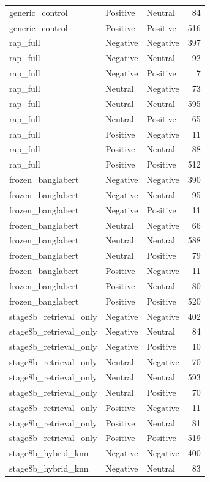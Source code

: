 \begin{tabular}{lllr}
generic_control & Positive & Neutral & 84 \\
generic_control & Positive & Positive & 516 \\
rap_full & Negative & Negative & 397 \\
rap_full & Negative & Neutral & 92 \\
rap_full & Negative & Positive & 7 \\
rap_full & Neutral & Negative & 73 \\
rap_full & Neutral & Neutral & 595 \\
rap_full & Neutral & Positive & 65 \\
rap_full & Positive & Negative & 11 \\
rap_full & Positive & Neutral & 88 \\
rap_full & Positive & Positive & 512 \\
frozen_banglabert & Negative & Negative & 390 \\
frozen_banglabert & Negative & Neutral & 95 \\
frozen_banglabert & Negative & Positive & 11 \\
frozen_banglabert & Neutral & Negative & 66 \\
frozen_banglabert & Neutral & Neutral & 588 \\
frozen_banglabert & Neutral & Positive & 79 \\
frozen_banglabert & Positive & Negative & 11 \\
frozen_banglabert & Positive & Neutral & 80 \\
frozen_banglabert & Positive & Positive & 520 \\
stage8b_retrieval_only & Negative & Negative & 402 \\
stage8b_retrieval_only & Negative & Neutral & 84 \\
stage8b_retrieval_only & Negative & Positive & 10 \\
stage8b_retrieval_only & Neutral & Negative & 70 \\
stage8b_retrieval_only & Neutral & Neutral & 593 \\
stage8b_retrieval_only & Neutral & Positive & 70 \\
stage8b_retrieval_only & Positive & Negative & 11 \\
stage8b_retrieval_only & Positive & Neutral & 81 \\
stage8b_retrieval_only & Positive & Positive & 519 \\
stage8b_hybrid_knn & Negative & Negative & 400 \\
stage8b_hybrid_knn & Negative & Neutral & 83 \\

\end{tabular}
